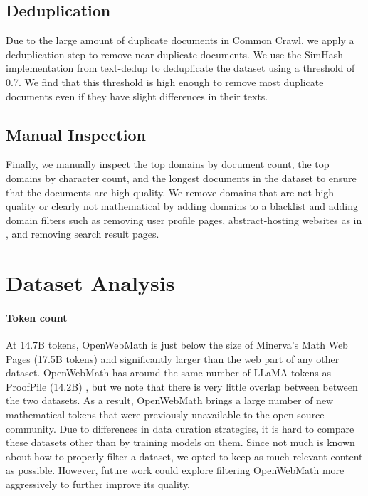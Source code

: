 \subsection{Deduplication}

Due to the large amount of duplicate documents in Common Crawl, we apply a deduplication step to remove near-duplicate documents. We use the SimHash implementation from text-dedup \citep{text-dedup} to deduplicate the dataset using a threshold of 0.7. We find that this threshold is high enough to remove most duplicate documents even if they have slight differences in their texts.

\subsection{Manual Inspection}

Finally, we manually inspect the top domains by document count, the top domains by character count, and the longest documents in the dataset to ensure that the documents are high quality. We remove domains that are not high quality or clearly not mathematical by adding domains to a blacklist and adding domain filters such as removing user profile pages, abstract-hosting websites as in \citet{lewkowycz2022solving}, and removing search result pages.

\section{Dataset Analysis}

\paragraph{Token count} At 14.7B tokens, OpenWebMath is just below the size of Minerva's Math Web Pages (17.5B tokens) \citet{lewkowycz2022solving} and significantly larger than the web part of any other dataset. OpenWebMath has around the same number of LLaMA tokens as ProofPile (14.2B) \citep{azerbayev2023proofnet}, but we note that there is very little overlap between between the two datasets. As a result, OpenWebMath brings a large number of new mathematical tokens that were previously unavailable to the open-source community. Due to differences in data curation strategies, it is hard to compare these datasets other than by training models on them. Since not much is known about how to properly filter a dataset, we opted to keep as much relevant content as possible. However, future work could explore filtering OpenWebMath more aggressively to further improve its quality.

